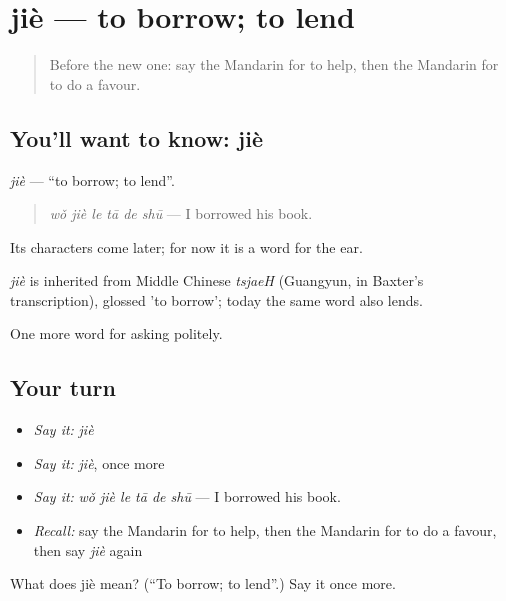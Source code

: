 \section[jiè]{jiè — to borrow; to lend}

\label{lesson:ZH-C64-jie}



\begin{quote}
Before the new one: say the Mandarin for to help, then the Mandarin for to do a favour.
\end{quote}

\subsection*{You'll want to know: jiè}
\emph{jiè} — \textquotedblleft{}to borrow; to lend\textquotedblright{}.

\begin{quote}
\emph{wǒ jiè le tā de shū} — I borrowed his book.
\end{quote}

Its characters come later; for now it is a word for the ear.

\begin{cousinweb}
\emph{jiè} is inherited from Middle Chinese \emph{tsjaeH} (Guangyun, in Baxter's transcription), glossed 'to borrow'; today the same word also lends.
\end{cousinweb}

\begin{grammarlens}[title={What you've built}]
One more word for asking politely.
\end{grammarlens}

\subsection*{Your turn}
\begin{itemize}
\raggedright
  \item \emph{Say it:} \emph{jiè}
  \item \emph{Say it:} \emph{jiè}, once more
  \item \emph{Say it:} \emph{wǒ jiè le tā de shū} — I borrowed his book.
  \item \emph{Recall:} say the Mandarin for to help, then the Mandarin for to do a favour, then say \emph{jiè} again
\end{itemize}

\begin{tcolorbox}[breakable,colback=teal!4,colframe=teal!35!black,title={Before you move on}]
What does jiè mean? (\textquotedblleft{}To borrow; to lend\textquotedblright{}.) Say it once more.
\end{tcolorbox}
